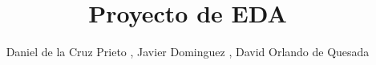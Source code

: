 \documentclass{article}
\begin{document}
    \title{Proyecto de EDA} 
    \author{Daniel de la Cruz Prieto , Javier Dominguez , David Orlando de Quesada} 

    \maketitle
\end{document}
